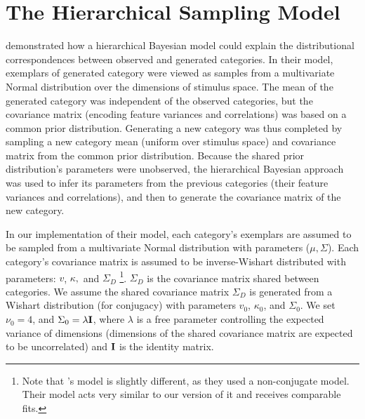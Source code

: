\documentclass[12pt]{article}
\newcommand\nbcnote[1]{\todo[inline, backgroundcolor = yellow]{\textbf{NBC}: #1}}
\begin{document}
\clearpage


\clearpage


\appendix
{}

\section{The Hierarchical Sampling Model}
\label{ap:hsampling-definition}

\cite{jern2013probabilistic} demonstrated how a hierarchical Bayesian model could explain the distributional correspondences between observed and generated categories. In their model, exemplars of generated category were viewed as samples from a multivariate Normal distribution over the dimensions of stimulus space. The mean of the generated category was independent of the observed categories, but the covariance matrix (encoding feature variances and correlations) was based on a common prior distribution. Generating a new category was thus completed by sampling a new category mean (uniform over stimulus space) and covariance matrix from the common prior distribution. Because the shared prior distribution's parameters were unobserved, the hierarchical Bayesian approach was used to infer its parameters from the previous categories (their feature variances and correlations), and then to generate the covariance matrix of the new category.

In our implementation of their model, each category's exemplars are assumed to be sampled from a multivariate Normal distribution with parameters ($\mu, \Sigma$). Each category's covariance matrix is assumed to be inverse-Wishart distributed with parameters: $v$, $\kappa,$ and $\Sigma_D$
\footnote{Note that \citet{jern2013probabilistic}'s model is slightly different, as they used a non-conjugate model. Their model acts very similar to our version of it and receives comparable fits.}. 
$\Sigma_D$ is the covariance matrix shared between categories. We assume the shared covariance matrix $\Sigma_D$ is generated from a Wishart distribution (for conjugacy) with parameters $v_0$, $\kappa_0$, and $\Sigma_0$. We set $\nu_0 = 4$, and $\Sigma_0 = \lambda {\bf I}$, where $\lambda$ is a free parameter controlling the expected variance of dimensions (dimensions of the shared covariance matrix are expected to be uncorrelated) and ${\bf I}$ is the identity matrix.

\nbcnote{check on that $\nu_0 = 4$ business}
\end{document}
